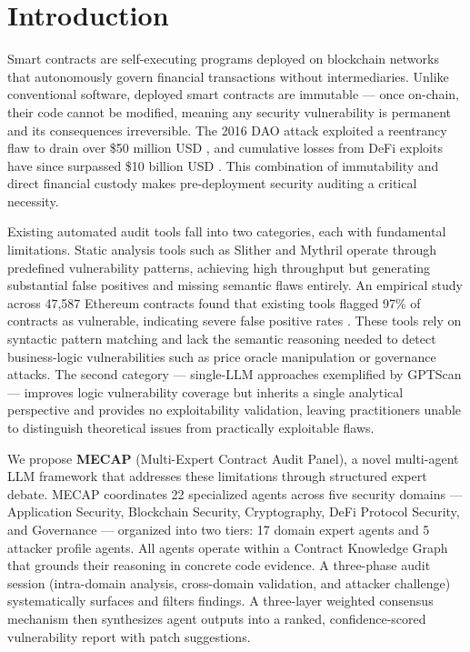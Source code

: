 \documentclass[10pt, conference, a4paper, compsocconf]{IEEEtran}
\begin{document}
\section{Introduction}

Smart contracts are self-executing programs deployed on blockchain networks that autonomously govern financial transactions without intermediaries. Unlike conventional software, deployed smart contracts are immutable --- once on-chain, their code cannot be modified, meaning any security vulnerability is permanent and its consequences irreversible. The 2016 DAO attack exploited a reentrancy flaw to drain over \$50 million USD \cite{mehar2019dao}, and cumulative losses from DeFi exploits have since surpassed \$10 billion USD \cite{carpentier2025defi}. This combination of immutability and direct financial custody makes pre-deployment security auditing a critical necessity.

Existing automated audit tools fall into two categories, each with fundamental limitations. Static analysis tools such as Slither \cite{feist2019slither} and Mythril \cite{mythril} operate through predefined vulnerability patterns, achieving high throughput but generating substantial false positives and missing semantic flaws entirely. An empirical study across 47,587 Ethereum contracts found that existing tools flagged 97\% of contracts as vulnerable, indicating severe false positive rates \cite{durieux2020empirical}. These tools rely on syntactic pattern matching and lack the semantic reasoning needed to detect business-logic vulnerabilities such as price oracle manipulation or governance attacks. The second category --- single-LLM approaches exemplified by GPTScan \cite{sun2024gptscan} --- improves logic vulnerability coverage but inherits a single analytical perspective and provides no exploitability validation, leaving practitioners unable to distinguish theoretical issues from practically exploitable flaws.

We propose \textbf{MECAP} (Multi-Expert Contract Audit Panel), a novel multi-agent LLM framework that addresses these limitations through structured expert debate. MECAP coordinates 22 specialized agents across five security domains --- Application Security, Blockchain Security, Cryptography, DeFi Protocol Security, and Governance --- organized into two tiers: 17 domain expert agents and 5 attacker profile agents. All agents operate within a Contract Knowledge Graph that grounds their reasoning in concrete code evidence. A three-phase audit session (intra-domain analysis, cross-domain validation, and attacker challenge) systematically surfaces and filters findings. A three-layer weighted consensus mechanism then synthesizes agent outputs into a ranked, confidence-scored vulnerability report with patch suggestions.
\end{document}
